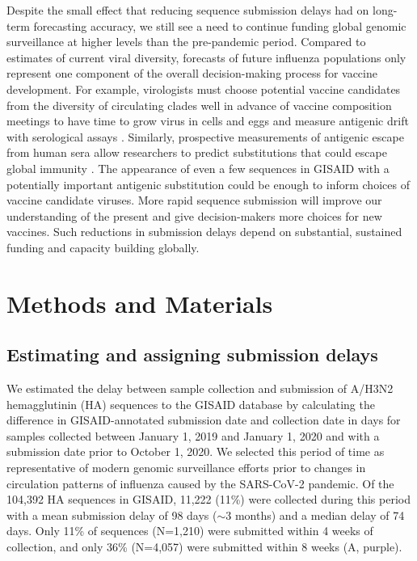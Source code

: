 \documentclass[9pt,lineno]{elife}
\begin{document}
Despite the small effect that reducing sequence submission delays had on long-term forecasting accuracy, we still see a need to continue funding global genomic surveillance at higher levels than the pre-pandemic period.
Compared to estimates of current viral diversity, forecasts of future influenza populations only represent one component of the overall decision-making process for vaccine development.
For example, virologists must choose potential vaccine candidates from the diversity of circulating clades well in advance of vaccine composition meetings to have time to grow virus in cells and eggs and measure antigenic drift with serological assays \citep{Morris2018,Loes2024}.
Similarly, prospective measurements of antigenic escape from human sera allow researchers to predict substitutions that could escape global immunity \citep{Lee2019,Greaney2022,Welsh2023}.
The appearance of even a few sequences in GISAID with a potentially important antigenic substitution could be enough to inform choices of vaccine candidate viruses.
More rapid sequence submission will improve our understanding of the present and give decision-makers more choices for new vaccines.
Such reductions in submission delays depend on substantial, sustained funding and capacity building globally.


\section{Methods and Materials}

\subsection{Estimating and assigning submission delays}

We estimated the delay between sample collection and submission of A/H3N2 hemagglutinin (HA) sequences to the GISAID database \citep{gisaid} by calculating the difference in GISAID-annotated submission date and collection date in days for samples collected between January 1, 2019 and January 1, 2020 and with a submission date prior to October 1, 2020.
We selected this period of time as representative of modern genomic surveillance efforts prior to changes in circulation patterns of influenza caused by the SARS-CoV-2 pandemic.
Of the 104,392 HA sequences in GISAID, 11,222 (11\%) were collected during this period with a mean submission delay of 98 days ($\sim$3 months) and a median delay of 74 days.
Only 11\% of sequences (N=1,210) were submitted within 4 weeks of collection, and only 36\% (N=4,057) were submitted within 8 weeks (A, purple).
\end{document}
